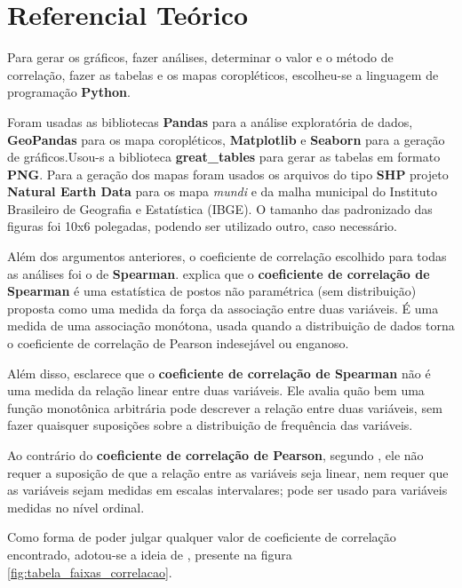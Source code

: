 \chapter{Referencial Teórico}

Para gerar os gráficos, fazer análises, determinar o valor e o método de correlação, fazer as tabelas e os mapas coropléticos, escolheu-se a linguagem de programação \textbf{Python}.

Foram usadas as bibliotecas \textbf{Pandas} para a análise exploratória de dados, \textbf{GeoPandas} para os mapa coropléticos, \textbf{Matplotlib} e \textbf{Seaborn} para a geração  de gráficos.Usou-s a biblioteca \textbf{great_tables} para gerar as tabelas em formato \textbf{PNG}. Para a geração dos mapas foram usados os arquivos do tipo \textbf{SHP} projeto \textbf{Natural Earth Data} para os mapa \textit{mundi} e da malha municipal do Instituto Brasileiro de Geografia e Estatística (IBGE). O tamanho das padronizado das figuras foi 10x6 polegadas, podendo ser utilizado outro, caso necessário.

Além dos argumentos anteriores, o coeficiente de correlação escolhido para todas as análises foi o de \textbf{Spearman}. \cite{hauke2011comparison} explica que o \textbf{coeficiente de correlação de Spearman} é uma estatística de postos não paramétrica (sem distribuição) proposta como uma medida da força da associação entre duas variáveis. É uma medida de uma associação monótona, usada quando a distribuição de dados torna o coeficiente de correlação de Pearson indesejável ou enganoso. 

Além disso, \cite{hauke2011comparison} esclarece que o \textbf{coeficiente de correlação de Spearman} não é uma medida da relação linear entre duas variáveis. Ele avalia quão bem uma função monotônica arbitrária pode descrever a relação entre duas variáveis, sem fazer quaisquer suposições sobre a distribuição de frequência das variáveis.

Ao contrário do \textbf{coeficiente de correlação de Pearson}, segundo \cite{hauke2011comparison}, ele não requer a suposição de que a relação entre as variáveis seja linear, nem requer que as variáveis sejam medidas em escalas intervalares; pode ser usado para variáveis medidas no nível ordinal.

Como forma de poder julgar qualquer valor de coeficiente de correlação encontrado, adotou-se a ideia de \cite{ali2022spearman}, presente na figura \ref{fig:tabela_faixas_correlacao}.

